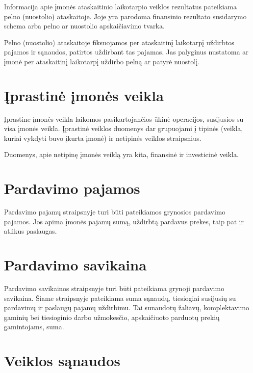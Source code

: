 
Informacija apie įmonės ataskaitinio laikotarpio veiklos rezultatus
pateikiama pelno (nuostolio) ataskaitoje. Joje yra parodoma finansinio
rezultato susidarymo schema arba pelno ar nuostolio apskaičiavimo
tvarka.

Pelno (nuostolio) ataskaitoje fiksuojamos per ataskaitinį laikotarpį
uždirbtos pajamos ir sąnaudos, patirtos uždirbant tas pajamas. Jas
palyginus nustatoma ar įmonė per ataskaitinį laikotarpį uždirbo pelną
ar patyrė nuostolį.

\section{Įprastinė įmonės veikla}


Įprastine įmonės veikla laikomos pasikartojančios ūkinė operacijos,
susijusios su visa įmonės veikla. Įprastinė veiklos duomenys dar grupuojami
į tipinės (veikla, kuriai vykdyti buvo įkurta įmonė) ir netipinės
veiklos straipsnius.

Duomenys, apie netipinę įmonės veiklą yra kita, finansinė ir investicinė
veikla.

\section{Pardavimo pajamos}


Pardavimo pajamų straipsnyje turi būti pateikiamos grynosios pardavimo
pajamos. Jos apima įmonės pajamų sumą, uždirbtą pardavus prekes,
taip pat ir atlikus paslaugas.

\section{Pardavimo savikaina}


Pardavimo savikainos straipsnyje turi būti pateikiama grynoji pardavimo
savikaina. Šiame straipsnyje pateikiama suma sąnaudų, tiesiogiai susijusių
su pardavimų ir paslaugų pajamų uždirbimu. Tai sunaudotų žaliavų,
komplektavimo gaminių bei tiesioginio darbo užmokesčio, apskaičiuoto
parduotų prekių gamintojams, suma.

\section{Veiklos sąnaudos}

